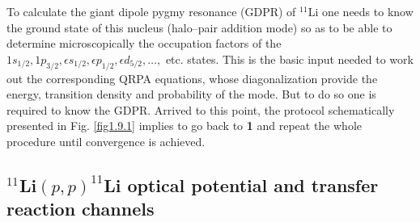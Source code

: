 To calculate the giant dipole pygmy resonance (GDPR) of $^{11}$Li one needs to know the ground state of this nucleus (halo--pair addition mode) so as to be able to determine microscopically the occupation factors of the $1s_{1/2},1p_{3/2},\epsilon s_{1/2},\epsilon p_{1/2},\epsilon d_{5/2},\dots,$ etc. states.  This is the basic input needed to work out the corresponding QRPA equations, whose diagonalization provide the energy, transition density and probability of the mode. But to do so one is required to know the GDPR. Arrived to this point, the protocol schematically presented in Fig. \ref{fig1.9.1}  implies to  go back to \textbf{1} and repeat the whole procedure until   convergence is achieved. 

\subsection{$^{11}$Li$(p,p)^{11}$Li optical potential and transfer reaction channels}

